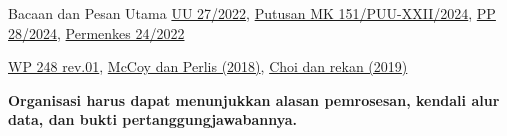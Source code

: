 \documentclass[aspectratio=169, table, 12pt]{beamer}
\begin{document}
\begin{frame}{{\Large Bacaan dan Pesan Utama}}
  \vspace{6pt}
  \small
  \href{https://peraturan.bpk.go.id/Details/229798/uu-no-27-tahun-2022}{UU 27/2022},
  \href{https://s.mkri.id/simpp/ds/6889d006383b1.pdf}{Putusan MK 151/PUU-XXII/2024},
  \href{https://peraturan.bpk.go.id/Details/294077}{PP 28/2024},
  \href{https://peraturan.bpk.go.id/Details/245544}{Permenkes 24/2022}\par
  \href{https://ec.europa.eu/newsroom/article29/items/611236}{WP 248 rev.01},
  \href{https://doi.org/10.1001/jama.2018.9222}{McCoy dan Perlis (2018)},
  \href{https://doi.org/10.1111/1475-6773.13203}{Choi dan rekan (2019)}\par
  \vspace{14pt}
  \begin{center}
    \large\textbf{Organisasi harus dapat menunjukkan alasan pemrosesan, kendali alur data, dan bukti
    pertanggungjawabannya.}
  \end{center}
\end{frame}
\end{document}
